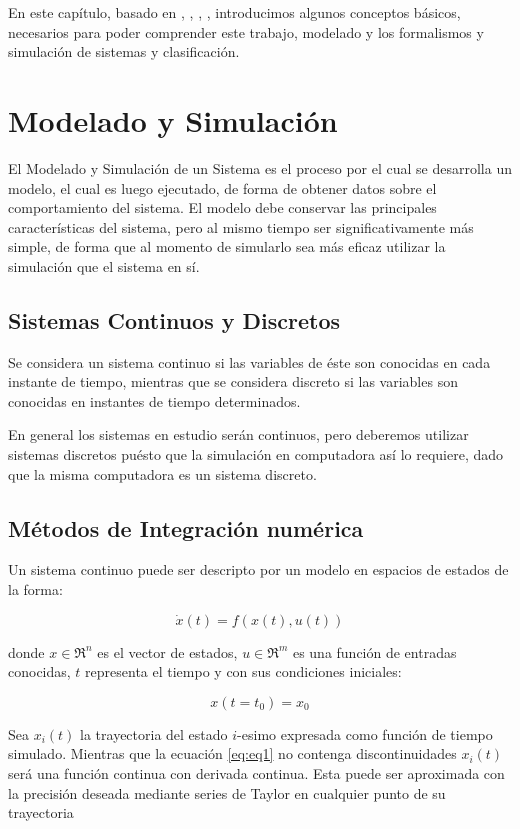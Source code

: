 En este capítulo, basado en \cite{Fer12}, \cite{Ber12Th}, \cite{BK11}, \cite{BK13}, introducimos algunos conceptos básicos, necesarios para poder comprender este trabajo, modelado y los formalismos y simulación de sistemas y clasificación.

\section{Modelado y Simulación}
	El Modelado y Simulación\cite{Zeigler} de un Sistema es el proceso por el cual se desarrolla un modelo, el cual es luego ejecutado, de forma de obtener datos 
	sobre el comportamiento del sistema. El modelo debe conservar las principales características del sistema, pero al mismo tiempo ser significativamente 
	más simple, de forma que al momento de simularlo sea más eficaz utilizar la simulación que el sistema en sí.

	\subsection{Sistemas Continuos y Discretos}
	Se considera un sistema continuo si las variables de éste son conocidas en cada instante de tiempo, mientras que se considera discreto si las 
	variables son conocidas en instantes de tiempo determinados.

	En general los sistemas en estudio serán continuos, pero deberemos utilizar sistemas discretos puésto que la simulación en computadora así lo 
	requiere, dado que la misma computadora es un sistema discreto.

	\subsection{Métodos de Integración numérica}
	Un sistema continuo puede ser descripto por un modelo en espacios de estados de la forma:

	\begin{equation} \label{eq:eq1}
	\dot{x}(t) = f (x(t), u(t))
	\end{equation}

	donde $x \in \Re^n$  es el vector de estados, $u \in \Re^m$ es una función de entradas conocidas,
	$t$ representa el tiempo y con sus condiciones iniciales:

	\begin{equation} \label{eq:eq2}
	x(t = t_0 ) = x_0
	\end{equation}

	Sea $x_i (t)$ la trayectoria del estado $i$-esimo expresada como función de tiempo simulado. 
	Mientras que la ecuación  \eqref{eq:eq1} no contenga discontinuidades $x_i (t)$ será una función continua con derivada continua. 
	Esta puede ser aproximada con la precisión deseada mediante series de Taylor en cualquier punto de su trayectoria


